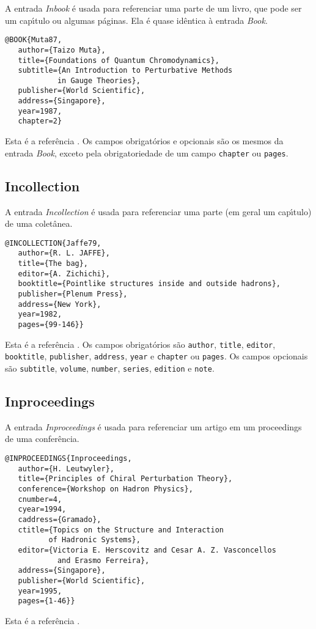 \documentclass[a4paper,12pt]{article}
\newcommand{\ii}{\'{\i}}
\newcommand{\enf}{\em}
\begin{document}
A entrada {\enf Inbook} \'e usada para referenciar uma parte de um livro,
que pode ser um cap{\ii}tulo ou algumas p\'aginas. Ela \'e quase
id\^entica \`a entrada {\enf Book}.
\begin{verbatim}
@BOOK{Muta87,
   author={Taizo Muta},
   title={Foundations of Quantum Chromodynamics},
   subtitle={An Introduction to Perturbative Methods
            in Gauge Theories},
   publisher={World Scientific},
   address={Singapore},
   year=1987,
   chapter=2}
\end{verbatim}
Esta \'e a refer\^encia \cite{Muta87in}.
Os campos obrigat\'orios e opcionais s\~ao os mesmos da entrada
{\enf Book}, exceto pela obrigatoriedade de um campo
\verb+chapter+ ou \verb+pages+.



\subsection*{Incollection}

A entrada {\enf Incollection} \'e usada para referenciar 
uma parte (em geral um cap{\ii}tulo) de uma colet\^anea.
\begin{verbatim}
@INCOLLECTION{Jaffe79,
   author={R. L. JAFFE},
   title={The bag},
   editor={A. Zichichi},
   booktitle={Pointlike structures inside and outside hadrons},
   publisher={Plenum Press},
   address={New York},
   year=1982,
   pages={99-146}}
\end{verbatim}
Esta \'e a refer\^encia \cite{Jaffe79}.
Os campos obrigat\'orios s\~ao \verb+author+, \verb+title+, \verb+editor+,
\verb+booktitle+, \verb+publisher+, \verb+address+, \verb+year+ e
\verb+chapter+ ou \verb+pages+.
Os campos opcionais s\~ao \verb+subtitle+, \verb+volume+, \verb+number+,
\verb+series+, \verb+edition+ e \verb+note+.



\subsection*{Inproceedings}

A entrada {\enf Inproceedings} \'e usada para referenciar um artigo em um 
proceedings de uma confer\^encia.
\begin{verbatim}
@INPROCEEDINGS{Inproceedings,
   author={H. Leutwyler},
   title={Principles of Chiral Perturbation Theory},
   conference={Workshop on Hadron Physics},
   cnumber=4,
   cyear=1994,
   caddress={Gramado},
   ctitle={Topics on the Structure and Interaction
          of Hadronic Systems},
   editor={Victoria E. Herscovitz and Cesar A. Z. Vasconcellos
            and Erasmo Ferreira},
   address={Singapore},
   publisher={World Scientific},
   year=1995,
   pages={1-46}}
\end{verbatim}
Esta \'e a refer\^encia \cite{Inproceedings}.
\end{document}

